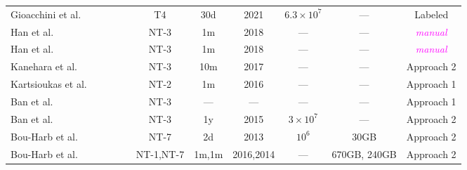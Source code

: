 \documentclass[manuscript,nonacm]{acmart}
\newcommand{\cmark}{\ding{51}}%
\newcommand{\wc}[1]{\textit{\textcolor{magenta}{#1}}} %
\begin{document}
\begin{table}[h!]
\begin{tabular}{@{}lccccccccc@{}}
        Gioacchini et al.~\cite{2021gioacchini,2023gioacchini}
        & \cite{2020cohen}
        & \cmark & \cmark
        & T4
        & 30d & 2021
        & $6.3\times10^{7}$ & ---
        & Labeled \\


        Han et al.~\cite{2020han,2022han}
        & \cite{2006takeuchi}
        & \cmark & \cmark
        & NT-3
        & 1m & 2018
        & --- & ---
        & \wc{manual} \\

        Han et al.~\cite{2021han,2022han}
        & \cite{2020han,2006takeuchi,2019kanehara}
        & \cmark & 
        & NT-3
        & 1m & 2018
        & --- & ---
        & \wc{manual} \\

        Kanehara et al.~\cite{2019kanehara,2022han}
        & \cite{2021han,2020han,2006takeuchi}
        & \cmark & \cmark
        & NT-3
        & 10m & 2017
        & --- & ---
        & Approach 2 \\

        Kartsioukas et al.~\cite{2023kartsioukas}
        & \cite{2004lakhina}
        & \cmark & \cmark
        & NT-2
        & 1m & 2016
        & --- & ---
        & Approach 1 \\

        Ban et al.~\cite{2017ban}
        & \cite{2012ban}
        &  & 
        & NT-3
        & --- & ---
        & --- & ---
        & Approach 1 \\

        Ban et al.~\cite{2016ban}
        & 
        &  & 
        & NT-3
        & 1y & 2015
        & $3\times10^{7}$ & ---
        & Approach 2 \\

        Bou-Harb et al.~\cite{2014bouharb}
        &  
        &  & 
        & NT-7
        & 2d & 2013
        & $10^6$ & 30GB
        & Approach 2 \\

        Bou-Harb et al.~\cite{2019bouharb,2015bouharb}
        & ~\cite{2018bouharb}
        &  & \cmark
        & NT-1,NT-7
        & 1m,1m & 2016,2014
        & --- & 670GB, 240GB
        & Approach 2 \\


\end{tabular}
\end{table}
\end{document}
